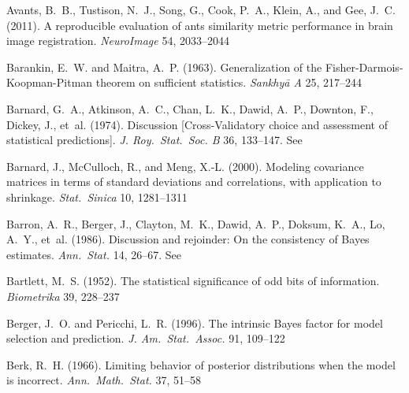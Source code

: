 \documentclass[%
]{frontiersSCNS-nologo} %
\newcommand*{\citebi}[2][]{\citet[#1]{#2}%
}
\renewcommand*{\|}{\mathpunct{|}}%
\begin{document}
\begin{thebibliography}{156}
Avants, B.~B., Tustison, N.~J., Song, G., Cook, P.~A., Klein, A., and Gee,
  J.~C. (2011).
\newblock A reproducible evaluation of ants similarity metric performance in
  brain image registration.
\newblock \emph{NeuroImage} 54, 2033--2044

Barankin, E.~W. and Maitra, A.~P. (1963).
\newblock Generalization of the {Fisher-Darmois-Koopman-Pitman} theorem on
  sufficient statistics.
\newblock \emph{Sankhy{\=a} A} 25, 217--244

Barnard, G.~A., Atkinson, A.~C., Chan, L.~K., Dawid, A.~P., Downton, F.,
  Dickey, J., et~al. (1974).
\newblock Discussion {[}{Cross-Validatory} choice and assessment of statistical
  predictions{]}.
\newblock \emph{J. Roy.\ Stat.\ Soc. B} 36, 133--147.
\newblock See \citebi{stone1974}

Barnard, J., McCulloch, R., and Meng, X.-L. (2000).
\newblock Modeling covariance matrices in terms of standard deviations and
  correlations, with application to shrinkage.
\newblock \emph{Stat.\ Sinica} 10, 1281--1311

Barron, A.~R., Berger, J., Clayton, M.~K., Dawid, A.~P., Doksum, K.~A., Lo,
  A.~Y., et~al. (1986).
\newblock Discussion and rejoinder: {On} the consistency of {Bayes} estimates.
\newblock \emph{Ann.\ Stat.} 14, 26--67.
\newblock See \citebi{diaconisetal1986}

Bartlett, M.~S. (1952).
\newblock The statistical significance of odd bits of information.
\newblock \emph{Biometrika} 39, 228--237

Berger, J.~O. and Pericchi, L.~R. (1996).
\newblock The intrinsic {Bayes} factor for model selection and prediction.
\newblock \emph{J. Am.\ Stat.\ Assoc.} 91, 109--122

Berk, R.~H. (1966).
\newblock Limiting behavior of posterior distributions when the model is
  incorrect.
\newblock \emph{Ann.\ Math.\ Stat.} 37, 51--58


\end{thebibliography}
\end{document}
